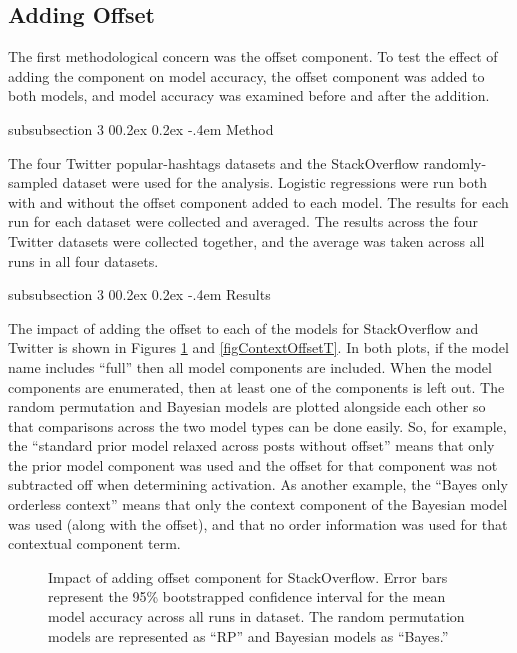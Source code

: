 \documentclass[man,floatsintext,donotrepeattitle]{apa6}
\makeatletter
\renewcommand{\subsubsection}{%
  \@startsection
  {subsubsection}%
  {3}%
  {\parindent}%
  {0\baselineskip \@plus 0.2ex \@minus 0.2ex}%
  {-.4em}%
  {\normalfont\normalsize\bfseries\addperi}}
\makeatother
\begin{document}
\subsection{Adding Offset}

The first methodological concern was the offset component.
To test the effect of adding the component on model accuracy, the offset component was added to both models, and model accuracy was examined before and after the addition.

\subsubsection{Method}

The four Twitter popular-hashtags datasets and the StackOverflow randomly-sampled dataset were used for the analysis.
Logistic regressions were run both with and without the offset component added to each model.
The results for each run for each dataset were collected and averaged.
The results across the four Twitter datasets were collected together, and the average was taken across all runs in all four datasets.

\subsubsection{Results}

The impact of adding the offset to each of the models for StackOverflow and Twitter is shown in Figures \ref{figContextOffsetSO} and \ref{figContextOffsetT}.
In both plots, if the model name includes ``full'' then all model components are included.
When the model components are enumerated, then at least one of the components is left out.
The random permutation and Bayesian models are plotted alongside each other so that comparisons across the two model types can be done easily.
So, for example, the ``standard prior model relaxed across posts without offset'' means that only the prior model component was used and the offset for that component was not subtracted off when determining activation.
As another example, the ``Bayes only orderless context'' means that only the context component of the Bayesian model was used (along with the offset), and that no order information was used for that contextual component term.

\begin{figure}[!htbp]
  \caption{
    Impact of adding offset component for StackOverflow.
    Error bars represent the 95\% bootstrapped confidence interval for the mean model accuracy across all runs in dataset.
    The random permutation models are represented as ``RP'' and Bayesian models as ``Bayes.''
}
  \label{figContextOffsetSO}
\end{figure}
\end{document}
